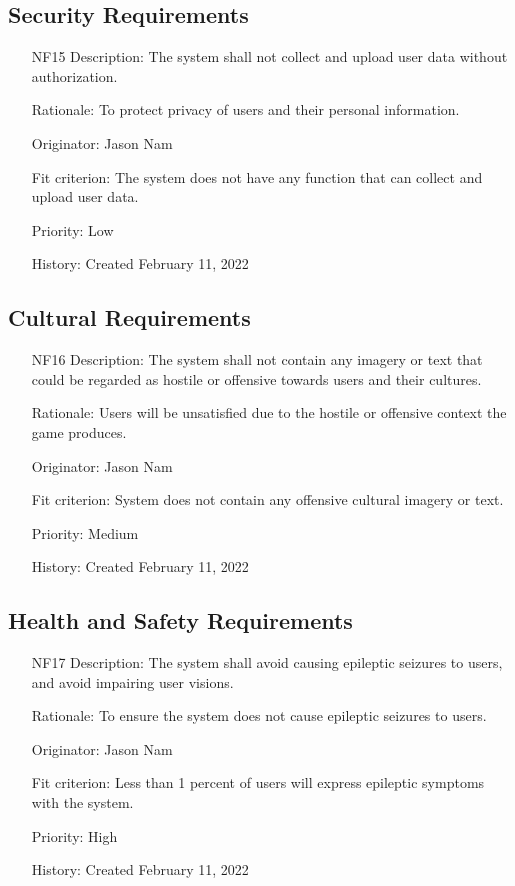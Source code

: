 \documentclass[12pt, titlepage]{article}
\begin{document}
\subsection{Security Requirements}

\begin{itemize}
    \item[NF15]
Description: The system shall not collect and upload user data without authorization.

Rationale: To protect privacy of users and their personal information.

Originator: Jason Nam

Fit criterion: The system does not have any function that can collect and upload user data.

Priority: Low

History: Created February 11, 2022

\end{itemize}

\subsection{Cultural Requirements}

\begin{itemize}
    \item[NF16]
Description: The system shall not contain any imagery or text that could be regarded as hostile or offensive towards users and their cultures.

Rationale: Users will be unsatisfied due to the hostile or offensive context the game produces.

Originator: Jason Nam

Fit criterion: System does not contain any offensive cultural imagery or text.

Priority: Medium

History: Created February 11, 2022

\end{itemize}

\subsection{Health and Safety Requirements}

\begin{itemize}
    \item[NF17]
Description: The system shall avoid causing epileptic seizures to users, and avoid impairing user visions.

Rationale: To ensure the system does not cause epileptic seizures to users.

Originator: Jason Nam

Fit criterion: Less than 1 percent of users will express epileptic symptoms with the system.

Priority: High

History: Created February 11, 2022

\end{itemize}
\end{document}
